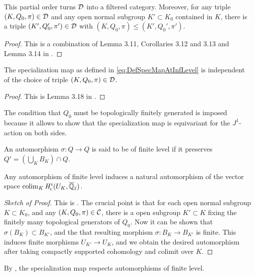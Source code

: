 \documentclass[../main.tex]{subfiles}
\begin{document}
\begin{lem}\label{lem:MiedaCategoryOfChoicesIsFiltered}
  This partial order turns $\mathcal{D}$ into a filtered category. Moreover, for any
  triple $(K, Q_0, \pi) \in \mathcal{D}$ and any open normal subgroup $K' \subset K_0$ 
  contained in $K$, there is a triple $(K', Q_0', \pi') \in \mathcal{D}$ with $(K, Q_0,
  \pi) \leq (K', Q_0', \pi')$. 
\begin{proof}
  This is a combination of Lemma 3.11, Corollaries 3.12 and 3.13 and 
  Lemma 3.14 in \cite{mieda2016geometric}.
\end{proof}
\end{lem}

\begin{prop}\label{lem:specmapisindependentofchoice}
  The specialization map as defined in \eqref{eq:DefSpecMapAtInfLevel} is
  independent of the choice of triple $(K, Q_0, \pi) \in \mathcal{D}$. 
  \begin{proof}
    This is Lemma 3.18 in \cite{mieda2016geometric}.
  \end{proof}
\end{prop}

The condition that $Q_0$ must be topologically finitely generated is imposed 
because it allows to show that the specialization map is equivariant for the 
$J^1$-action on both sides. 

\begin{defi}\label{def:MorphismOfFinLevel}
  An automorphism $\sigma\colon Q \to Q$ is said to be of finite level if it 
  preserves $Q' = (\bigcup_K B_K)\cap Q$. 
\end{defi}

\begin{lem}\label{lem:FinLevelAutoYIeldAutOfColim}
  Any automorphism of finite level
  induces a natural automorphism of the vector space $\operatorname*{colim}_K \mathit H_{\mathrm{c}}^i(U_K, {\overline {\mathbb{Q}}_\ell})$.
  \begin{proof}[Sketch of Proof] 
    This is \cite[Lemma 3.20]{mieda2016geometric}.  The crucial point 
    is that for each open normal subgroup $K \subset K_0$, and any 
    $(K, Q_0, \pi) \in \mathcal{C}$, there is a open subgroup $K' \subset K$ fixing the 
    finitely many topological generators of $Q_0$. Now it can be shown that 
    $\sigma(B_K) \subset B_{K'}$, and the that resulting morphism
    $\sigma\colon B_K \to B_{K'}$ is finite. This induces finite morphisms
    $U_{K'} \to U_K$, and we obtain the desired automorphism after taking 
    compactly supported cohomology and colimit over $K$. 
\end{proof}
\end{lem}
By \cite[Proposition 3.21]{mieda2016geometric}, the specialization map respects
automorphisms of finite level.
\end{document}
